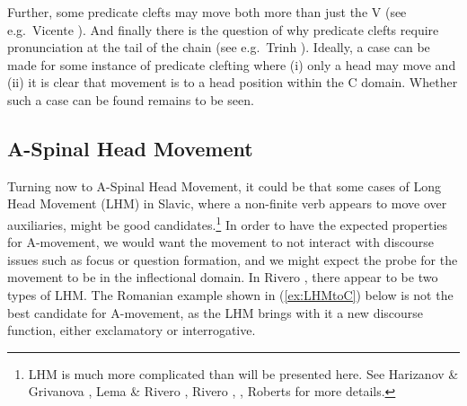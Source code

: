 \documentclass[output=paper,colorlinks,citecolor=brown,
]{langscibook}
\begin{document}
\z

Further, some predicate clefts may move both more than just the V (see e.g.\ Vicente \citeyearpar{Vicente:2009}).  And finally there is the question of why predicate clefts require pronunciation at the tail of the chain (see e.g.\ Trinh \citeyear{Trinh:2009}).  Ideally, a case can be made for some instance of predicate clefting where (i) only a head may move and (ii) it is clear that movement is to a head position within the C domain.  Whether such a case can be found remains to be seen.

\subsection{A-Spinal Head Movement}

Turning now to A-Spinal Head Movement, it could be that some cases of Long Head Movement (LHM) in Slavic, where a non-finite verb appears to move over auxiliaries, might be good candidates.\footnote{LHM is much more complicated than will be presented here.  See Harizanov \& Grivanova \citeyearpar{Harizanov:2018}, Lema \& Rivero \citeyearpar{Lema:1989}, Rivero \citeyearpar{Rivero:1991a},  \citeyearpar{Rivero:1994}, Roberts \citeyearpar{Roberts:2010} for more details.}  In order to have  the expected properties for A-movement, we would want the movement to  not interact with discourse issues such as focus or question formation, and we might expect the probe for the movement to be in the inflectional domain.  In Rivero \citeyearpar{Rivero:1994}, there appear to be two types of LHM.  The Romanian example shown in (\ref{ex:LHMtoC}) below is not the best candidate for A-movement, as the LHM brings with it a new discourse function, either exclamatory or interrogative.

\ea\label{ex:LHMtoC}
    \z
\z
\end{document}
